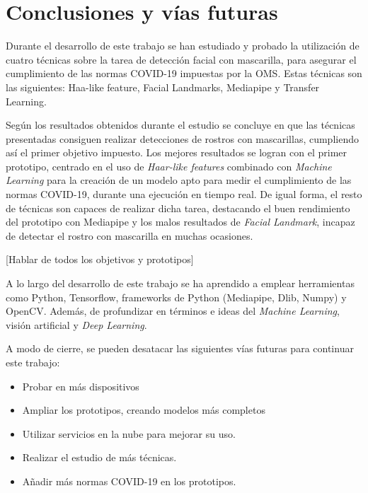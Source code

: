 
\chapter{Conclusiones y vías futuras}

Durante el desarrollo de este trabajo se han estudiado y probado la utilización de cuatro técnicas sobre la tarea de detección facial con mascarilla, para asegurar el cumplimiento de las normas COVID-19 impuestas por la OMS. Estas técnicas son las siguientes: Haa-like feature, Facial Landmarks, Mediapipe y Transfer Learning.

Según los resultados obtenidos durante el estudio se concluye en que las técnicas presentadas consiguen realizar detecciones de rostros con mascarillas, cumpliendo así el primer objetivo impuesto. Los mejores resultados se logran con el primer prototipo, centrado en el uso de \textit{Haar-like features} combinado con \textit{Machine Learning} para la creación de un modelo apto para medir el cumplimiento de las normas COVID-19, durante una ejecución en tiempo real. De igual forma, el resto de técnicas son capaces de realizar dicha tarea, destacando el buen rendimiento del prototipo con Mediapipe y los malos resultados de \textit{Facial Landmark}, incapaz de detectar el rostro con mascarilla en muchas ocasiones.

[Hablar de todos los objetivos y prototipos]

A lo largo del desarrollo de este trabajo se ha aprendido a emplear herramientas como Python, Tensorflow, frameworks de Python (Mediapipe, Dlib, Numpy) y OpenCV. Además, de profundizar en términos e ideas del \textit{Machine Learning}, visión artificial y \textit{Deep Learning}.

A modo de cierre, se pueden desatacar las siguientes vías futuras para continuar este trabajo:
\begin{itemize}
	\item Probar en más dispositivos
	\item Ampliar los prototipos, creando modelos más completos
	\item Utilizar servicios en la nube para mejorar su uso.
	\item Realizar el estudio de más técnicas.
	\item Añadir más normas COVID-19 en los prototipos.
\end{itemize}